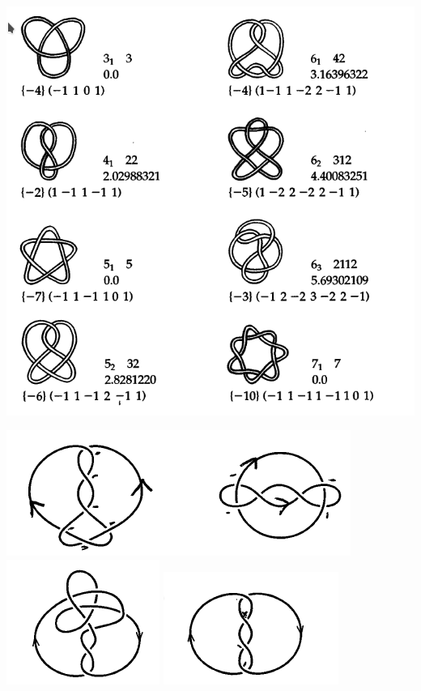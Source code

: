 \documentclass[12pt]{article}
\theoremstyle{definition}
\begin{document}
\includegraphics[scale=0.8]{pictures/small-knots.png}

\includegraphics[scale=0.8]{pictures/linking-number-1.png}
\includegraphics[scale=0.8]{pictures/linking-number-2.png}
\includegraphics[scale=0.8]{pictures/linking-number-3.png}
\newpage
\end{document}
